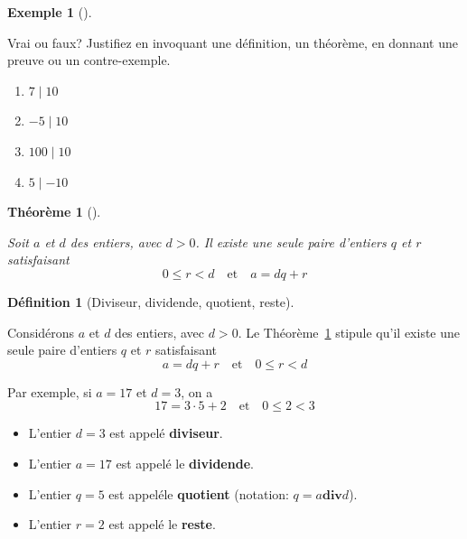 \documentclass[
  letterpaper,
]{scrbook}
\providecommand{\tightlist}{%
  \setlength{\itemsep}{0pt}\setlength{\parskip}{0pt}}\usepackage{longtable,booktabs,array}
\theoremstyle{definition}
\newtheorem{example}{Exemple}[chapter]
\theoremstyle{definition}
\newtheorem{definition}{Définition}[chapter]
\theoremstyle{plain}
\newtheorem{theorem}{Théorème}[chapter]
\theoremstyle{remark}
\begin{document}
\leavevmode{}%
\begin{example}[]\label{exm-vrai-faux-divisibilite}

Vrai ou faux? Justifiez en invoquant une définition, un théorème, en
donnant une preuve ou un contre-exemple.

\begin{enumerate}
\def\labelenumi{\alph{enumi})}
\tightlist
\item
  \(7\mid 10\)
\item
  \(-5\mid 10\)
\item
  \(100\mid 10\)
\item
  \(5\mid -10\)
\end{enumerate}

\end{example}

\leavevmode{}%
\begin{theorem}[]\label{thm-une-seule-paire-entiers}

Soit \(a\) et \(d\) des entiers, avec \(d>0\). Il existe une seule paire
d'entiers \(q\) et \(r\) satisfaisant \[
0\leq r<d \quad \text{et} \quad a=dq+r
\]

\end{theorem}

\leavevmode{}%
\begin{definition}[Diviseur, dividende, quotient,
reste]\label{def-diviseur-dividende-quotient-reste}

Considérons \(a\) et \(d\) des entiers, avec \(d>0\). Le
Théorème~\ref{thm-une-seule-paire-entiers} stipule qu'il existe une
seule paire d'entiers \(q\) et \(r\) satisfaisant \[
a=dq+r \quad \text{et} \quad 0\leq r<d
\]

Par exemple, si \(a=17\) et \(d=3\), on a \[
17=3\cdot 5+2 \quad \text{et} \quad 0\leq 2<3
\]

\begin{itemize}
\tightlist
\item
  L'entier \(d=3\) est appelé \textbf{diviseur}.
\item
  L'entier \(a=17\) est appelé le \textbf{dividende}.
\item
  L'entier \(q=5\) est appeléle \textbf{quotient} (notation:
  \(q=a\mathbf{div} d\)).
\item
  L'entier \(r=2\) est appelé le \textbf{reste}.
\end{itemize}

\end{definition}
\end{document}
